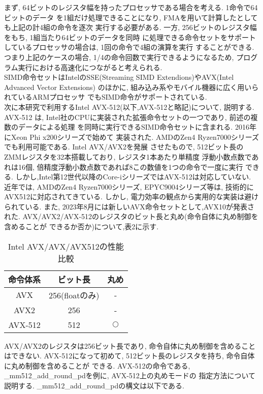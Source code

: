 \documentclass[11pt,a4paper]{jsreport}
\theoremstyle{definition}
\begin{document}
まず, 64ビットのレジスタ幅を持ったプロセッサである場合を考える. 1命令で64ビットのデータ
を1組だけ処理できることになり, FMAを用いて計算したとしても上記の計4組の命令を逐次
実行する必要がある. 一方, 256ビットのレジスタ幅をもち, 1組当たり64ビットのデータを同時
に処理できる命令セットをサポートしているプロセッサの場合は, 1回の命令で4組の演算を実行
することができる. つまり上記のケースの場合, 1/4の命令回数で実行できるようになるため, 
プログラム実行における高速化につながると考えられる. \\
\indent  SIMD命令セットはIntelのSSE(Streaming SIMD Extendions)やAVX(Intel Advanced Vector Extensions)
のほかに, 組み込み系やモバイル機器に広く用いられているARMプロセッサ
でもSIMD命令がサポートされている. \\
\indent  次に本研究で利用するIntel AVX-512(以下,AVX-512と略記)について, 説明する. AVX-512
は, Intel社のCPUに実装された拡張命令セットの一つであり, 前述の複数のデータによる処理
を同時に実行できるSIMD命令セットに含まれる. 2016年にXeon Phi x200シリーズで始めて
実装された. AMDのZen4 Ryzen7000シリーズでも利用可能である. Intel AVX/AVX2を発展
させたもので, 512ビット長のZMMレジスタを32本搭載しており, レジスタ1本あたり単精度
浮動小数点数であれは16個, 倍精度浮動小数点数であれば8この数値を1つの命令で一度に実行
できる. しかし,Intel第12世代以降のCore-iシリーズではAVX-512は対応していない. 近年では, AMDのZen4 Ryzen7000シリーズ, EPYC9004シリーズ等は, 技術的にAVX512に対応されてきている. しかし, 電力効率の観点から実用的な実装は避けられている. また, 2023年8月には新しいAVX命令セットとして,AVX10が発表された.
  AVX/AVX2/AVX-512のレジスタのビット長と丸め(命令自体に丸め制御を含めることが
できるか否か)について,表2に示す.

\begin{table}[h]
  \centering
  \caption{Intel AVX/AVX/AVX512の性能比較}
  \begin{tabular}{c|c|c}
    命令体系 & ビット長 & 丸め \\ \hline \hline
    AVX & 256(floatのみ) & - \\ \hline
    AVX2 & 256 & - \\ \hline
    AVX-512 & 512 & $\bigcirc$ \\ \hline
  \end{tabular}
\end{table}

  AVX/AVX2のレジスタは256ビット長であり, 命令自体に丸め制御を含めることはできない. 
AVX-512になって初めて, 512ビット長のレジスタを持ち, 命令自体に丸め制御を含めることが
できる. AVX-512の命令である, \_mm512\_add\_round\_pdを例に, AVX-512上の丸めモードの
指定方法について説明する. \_mm512\_add\_round\_pdの構文は以下である.
\end{document}
